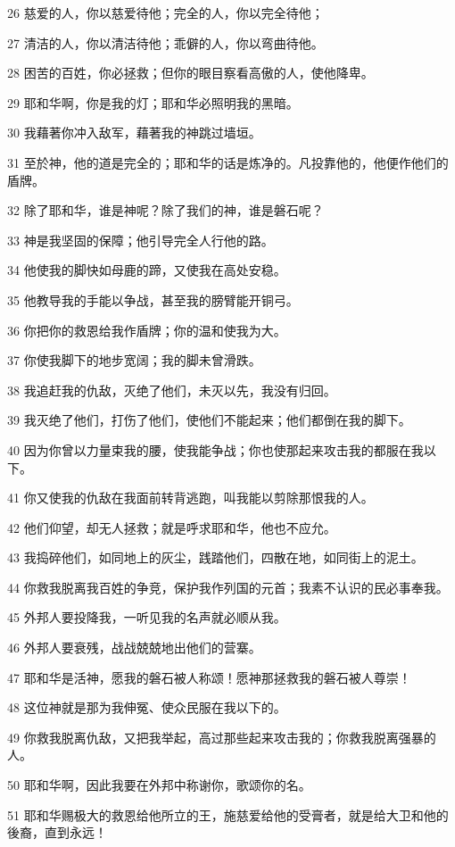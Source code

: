 \par 26 慈爱的人，你以慈爱待他；完全的人，你以完全待他；
\par 27 清洁的人，你以清洁待他；乖僻的人，你以弯曲待他。
\par 28 困苦的百姓，你必拯救；但你的眼目察看高傲的人，使他降卑。
\par 29 耶和华啊，你是我的灯；耶和华必照明我的黑暗。
\par 30 我藉著你冲入敌军，藉著我的神跳过墙垣。
\par 31 至於神，他的道是完全的；耶和华的话是炼净的。凡投靠他的，他便作他们的盾牌。
\par 32 除了耶和华，谁是神呢？除了我们的神，谁是磐石呢？
\par 33 神是我坚固的保障；他引导完全人行他的路。
\par 34 他使我的脚快如母鹿的蹄，又使我在高处安稳。
\par 35 他教导我的手能以争战，甚至我的膀臂能开铜弓。
\par 36 你把你的救恩给我作盾牌；你的温和使我为大。
\par 37 你使我脚下的地步宽阔；我的脚未曾滑跌。
\par 38 我追赶我的仇敌，灭绝了他们，未灭以先，我没有归回。
\par 39 我灭绝了他们，打伤了他们，使他们不能起来；他们都倒在我的脚下。
\par 40 因为你曾以力量束我的腰，使我能争战；你也使那起来攻击我的都服在我以下。
\par 41 你又使我的仇敌在我面前转背逃跑，叫我能以剪除那恨我的人。
\par 42 他们仰望，却无人拯救；就是呼求耶和华，他也不应允。
\par 43 我捣碎他们，如同地上的灰尘，践踏他们，四散在地，如同街上的泥土。
\par 44 你救我脱离我百姓的争竞，保护我作列国的元首；我素不认识的民必事奉我。
\par 45 外邦人要投降我，一听见我的名声就必顺从我。
\par 46 外邦人要衰残，战战兢兢地出他们的营寨。
\par 47 耶和华是活神，愿我的磐石被人称颂！愿神那拯救我的磐石被人尊崇！
\par 48 这位神就是那为我伸冤、使众民服在我以下的。
\par 49 你救我脱离仇敌，又把我举起，高过那些起来攻击我的；你救我脱离强暴的人。
\par 50 耶和华啊，因此我要在外邦中称谢你，歌颂你的名。
\par 51 耶和华赐极大的救恩给他所立的王，施慈爱给他的受膏者，就是给大卫和他的後裔，直到永远！

